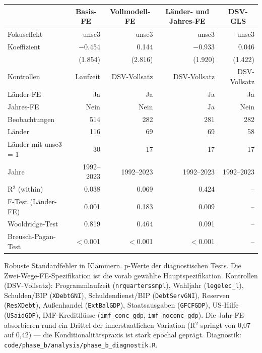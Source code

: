 \begingroup
\scriptsize
\setlength{\tabcolsep}{4pt}
\begin{center}
\begin{tabular}{l r r r r}
\toprule
& \multicolumn{1}{c}{Basis-FE} & \multicolumn{1}{c}{Vollmodell-FE} & \multicolumn{1}{c}{L\"ander- und Jahres-FE} & \multicolumn{1}{c}{DSV-GLS} \\
\midrule
Fokuseffekt & unsc3 & unsc3 & unsc3 & unsc3 \\
Koeffizient & $-$0.454 & 0.144 & $-$0.933 & 0.046 \\
& (1.854) & (2.816) & (1.920) & (1.422) \\
\midrule
Kontrollen & Laufzeit & DSV-Vollsatz & DSV-Vollsatz & DSV-Vollsatz \\
L\"ander-FE & Ja & Ja & Ja & Ja \\
Jahres-FE & Nein & Nein & Ja & Nein \\
\midrule
Beobachtungen & 514 & 282 & 281 & 282 \\
L\"ander & 116 & 69 & 69 & 58 \\
L\"ander mit unsc3 = 1 & 30 & 17 & 17 & 17 \\
Jahre & 1992--2023 & 1992--2023 & 1992--2023 & 1992--2023 \\
\midrule
R$^2$ (within) & 0.038 & 0.069 & 0.424 & -- \\
F-Test (L\"ander-FE) & 0.001 & 0.183 & 0.009 & -- \\
Wooldridge-Test & 0.819 & 0.464 & 0.091 & -- \\
Breusch-Pagan-Test & $<$0.001 & $<$0.001 & $<$0.001 & -- \\
\bottomrule
\end{tabular}
\label{tab:h1_modellvergleich}
\end{center}
\noindent\footnotesize Robuste Standardfehler in Klammern. p-Werte der diagnostischen Tests. Die Zwei-Wege-FE-Spezifikation ist die vorab gew\"ahlte Hauptspezifikation. Kontrollen (DSV-Vollsatz): Programmlaufzeit (\texttt{nrquarterssmpl}), Wahljahr (\texttt{legelec\_l}), Schulden/BIP (\texttt{XDebtGNI}), Schuldendienst/BIP (\texttt{DebtServGNI}), Reserven (\texttt{ResXDebt}), Au\ss enhandel (\texttt{ExtBalGDP}), Staatsausgaben (\texttt{GFCFGDP}), US-Hilfe (\texttt{USaidGDP}), IMF-Kreditfl\"usse (\texttt{imf\_conc\_gdp}, \texttt{imf\_noconc\_gdp}). Die Jahr-FE absorbieren rund ein Drittel der innerstaatlichen Variation (R$^2$ springt von 0{,}07 auf 0{,}42) — die Konditionalit\"atspraxis ist stark epochal gepr\"agt. Diagnostik: \texttt{code/phase\_b/analysis/phase\_b\_diagnostik.R}.\par
\endgroup

